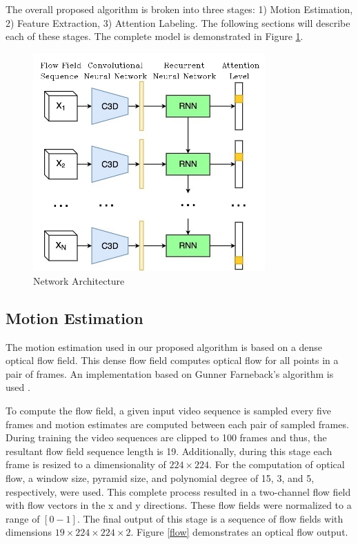 \documentclass[10pt, conference, compsocconf]{IEEEtran}
\begin{document}
The overall proposed algorithm is broken into three stages: 1) Motion Estimation, 2) Feature Extraction, 3) Attention Labeling. The following sections will describe each of these stages. The complete model is demonstrated in Figure \ref{net}.

\begin{figure}[!t]
\centering
\includegraphics[width=3.5in]{images/net}
\caption{Network Architecture}
\label{net}
\end{figure}

\subsection{Motion Estimation}
The motion estimation used in our proposed algorithm is based on a dense optical flow field. This dense flow field computes optical flow for all points in a pair of frames. An implementation based on Gunner Farneback's algorithm is used \cite{10.1007/3-540-45103-X_50}.

To compute the flow field, a given input video sequence is sampled every five frames and motion estimates are computed between each pair of sampled frames. During training the video sequences are clipped to 100 frames and thus, the resultant flow field sequence length is 19. Additionally, during this stage each frame is resized to a dimensionality of $224 \times 224$. For the computation of optical flow, a window size, pyramid size, and polynomial degree of 15, 3, and 5, respectively, were used. This complete process resulted in a two-channel flow field with flow vectors in the x and y directions. These flow fields were normalized to a range of $[0-1]$. The final output of this stage is a sequence of flow fields with dimensions $19\times 224\times 224\times 2$. Figure \ref{flow} demonstrates an optical flow output.
\end{document}
